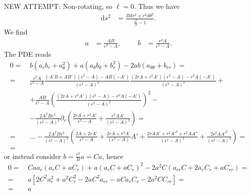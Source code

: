 \documentclass[english, parskip=full]{scrartcl}
\newcommand{\kla}{}
\newcommand{\klam}{}
\newcommand{\tecxt}{}
\begin{document}
NEW ATTEMPT:
Non-rotating, so $\ell = 0$.
Thus we have
\begin{align}
\tecxt\text{d}s^2 &= \frac{B\tecxt\text{d}r^2 + r^2\tecxt\text{d}\theta^2}{\frac{\epsilon^2}{A} - 1}.
\end{align}
We find
\begin{align}
a &= \frac{AB}{\epsilon^2 - A},&&& b &= \frac{r^2A}{\epsilon^2 - A}.
\end{align}
The PDE reads
\begin{align*}
0 = \ & b (a_rb_r + a_\theta^2) + a(a_\theta b_\theta + b_r^2) - 2ab(a_{\theta\theta} + b_{rr}) = \\
=\ & \frac{r^2A}{\epsilon^2 - A} \frac{(A'B + AB')(\epsilon^2 - A) - AB (-A')}{(\epsilon^2 - A)^2} \frac{(2rA + r^2A')(\epsilon^2 -A) - r^2A (-A')}{(\epsilon^2 - A)^2} + \\
&+ \frac{AB}{\epsilon^2-A} \kla\left( \frac{(2rA + r^2A')(\epsilon^2 -A) - r^2A (-A')}{(\epsilon^2 - A)^2} \right)^2 - \\
&- \frac{2A^2Br^2}{(\epsilon^2 - A)^2} \partial_r \kla\left( \frac{2rA + r^2A'}{\epsilon^2 - A} + \frac{r^2AA'}{(\epsilon^2 - A)^2} \right) = \\
= \ & \dots - \frac{2A^2Br^2}{(\epsilon^2 - A)^2} \kla\left( \frac{2A + 2rA'}{\epsilon^2 - A} + \frac{2rA + r^2A'}{(\epsilon^2 - A)} A' + \frac{2rAA' + r^2A'^2 + r^2AA''}{(\epsilon^2 - A)^2} + \frac{2r^2AA'^2}{(\epsilon^2 - A)^3} \right) = \\
= \ & 
\end{align*}
or instead consider $b = \frac{r^2}{B}a = Ca$, hence
\begin{align}
0 = \ & Ca a_r \kla\left( a_r C + aC_r \right) + a \kla\left( a_rC + aC_r \right)^2 - 2a^2C \kla\left( a_{rr}C + 2a_rC_r + aC_{rr} \right) = \\
=\ & a \klam\left[ 2C^2a_r^2 + a^2C_r^2 - 2aC^2a_{rr} - aCa_rC_r - 2a^2CC_{rr} \right] = \\
=\ & a
\end{align}
\end{document}
